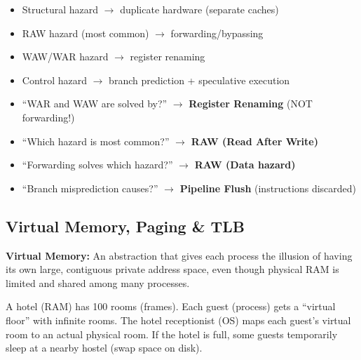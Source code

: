 \documentclass[11pt,a4paper]{article}
\newcommand{\highlight}[1]{\colorbox{yellow!50}{\textbf{#1}}}
\begin{document}
\begin{keypoint}
\begin{itemize}[noitemsep]
  \item Structural hazard $\to$ duplicate hardware (separate caches)
  \item RAW hazard (most common) $\to$ forwarding/bypassing
  \item WAW/WAR hazard $\to$ register renaming
  \item Control hazard $\to$ branch prediction + speculative execution
\end{itemize}
\end{keypoint}

\begin{mcqtrap}
\begin{itemize}[noitemsep]
  \item ``WAR and WAW are solved by?'' $\to$ \highlight{Register Renaming} (NOT forwarding!)
  \item ``Which hazard is most common?'' $\to$ \highlight{RAW (Read After Write)}
  \item ``Forwarding solves which hazard?'' $\to$ \highlight{RAW (Data hazard)}
  \item ``Branch misprediction causes?'' $\to$ \highlight{Pipeline Flush} (instructions discarded)
\end{itemize}
\end{mcqtrap}

\subsection{Virtual Memory, Paging \& TLB}

\begin{mydef}
\textbf{Virtual Memory:} An abstraction that gives each process the illusion of having its own large, contiguous private address space, even though physical RAM is limited and shared among many processes.
\end{mydef}

\begin{analogy}
A hotel (RAM) has 100 rooms (frames). Each guest (process) gets a ``virtual floor'' with infinite rooms. The hotel receptionist (OS) maps each guest's virtual room to an actual physical room. If the hotel is full, some guests temporarily sleep at a nearby hostel (swap space on disk).
\end{analogy}
\end{document}
